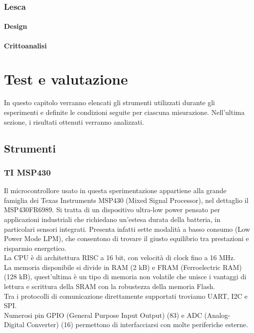 \documentclass[target=bach,aauheader=,style=]{thud}
\begin{document}
		\subsection{Lesca\cite{lesca}}
			\subsubsection{Design}
			\subsubsection{Crittoanalisi}
\chapter{Test e valutazione}
In questo capitolo verranno elencati gli strumenti utilizzati durante gli esperimenti e definite le condizioni seguite per ciascuna misurazione. Nell'ultima sezione, i risultati ottenuti verranno analizzati.
	\section{Strumenti}
		\subsection{TI MSP430}
		Il microcontrollore usato in questa sperimentazione appartiene alla grande famiglia dei Texas Instruments MSP430 (Mixed Signal Processor), nel dettaglio il MSP430FR6989. Si tratta di un dispositivo ultra-low power pensato per applicazioni industriali che richiedano un'estesa durata della batteria, in particolari sensori integrati. Presenta infatti sette modalità a basso consumo (Low Power Mode LPM), che consentono di trovare il giusto equilibrio tra prestazioni e risparmio energetico.\\
		La CPU è di architettura RISC a 16 bit, con velocità di clock fino a 16 MHz.\\
		La memoria disponibile si divide in RAM (2 kB) e FRAM (Ferroelectric RAM) (128 kB), quest'ultima è un tipo di memoria non volatile che unisce i vantaggi di lettura e scrittura della SRAM con la robustezza della memoria Flash.\\
		Tra i protocolli di comunicazione direttamente supportati troviamo UART, I2C e SPI.\\
		Numerosi pin GPIO (General Purpose Input Output) (83) e ADC (Analog-Digital Converter) (16) permettono di interfacciarsi con molte periferiche esterne\cite{mspuser,mspdatas}.
		
\end{document}
